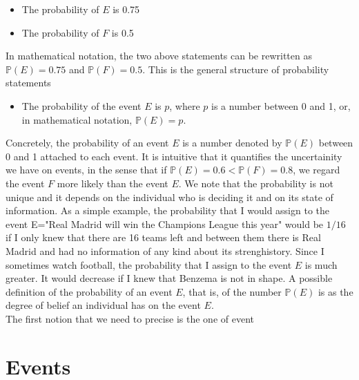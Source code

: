 \documentclass[reqno]{amsart}
\newcommand{\<}{{\langle \!\! \langle}}
\renewcommand{\>}{{\rangle \!\! \rangle}}
\begin{document}
\begin{itemize}

	\item The probability of $E$ is 0.75\\
	\item The probability of $F$ is 0.5\\

\end{itemize}

In mathematical notation, the two above statements can be rewritten as $\mathbb{P}(E)=0.75$ and $ \mathbb{P}(F)=0.5$. This is the general structure of probability statements

\begin{itemize}
	\item The probability of the event $E$  is $p$, where $p$ is a number between 0 and 1, or, in mathematical notation, $\mathbb{P}(E)=p$.\\    
\end{itemize} 

Concretely, the probability of an event $E$ is a number denoted by $\mathbb{P}(E)$ between 0 and 1 attached to each event. It is intuitive that it quantifies the uncertainity we have on events, in the sense that if $\mathbb{P}(E)=0.6< \mathbb{P}(F)=0.8$, we regard the event $F$ more likely than the event $E$. We note that the probability is not unique and it depends on the individual who is deciding it  and on its state of information. As a simple example, the probability that I would assign to the event E="Real Madrid will win the Champions League this year" would be $1/16$ if I only knew that there are 16 teams left and between them there is Real Madrid and had no information of any kind about its strenghistory. Since I sometimes watch football, the probability that I assign to the event $E$ is much greater. It would decrease if I knew that Benzema is not in shape.  A possible definition of the probability of an event $E$, that is, of the number $\mathbb{P}(E)$ is as the degree  of belief an individual has on the event $E$. \\
The first notion that we need to precise is the one of event

\section{Events}
\end{document}
